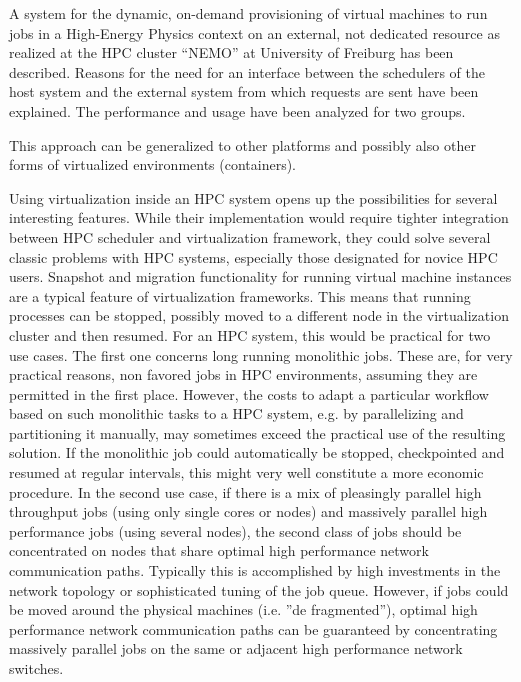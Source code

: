 



A system for the dynamic, on-demand provisioning of virtual machines
to run jobs in a High-Energy Physics context on an external, not
dedicated resource as realized at the HPC
cluster ``NEMO'' at University of Freiburg has been described. 
Reasons for the need for an interface between the schedulers of the host system
and the external system from which requests are sent have been
explained. 
The performance and usage have been analyzed for two groups. 

This approach can be generalized to other platforms and possibly also
other forms of virtualized environments (containers).


Using virtualization inside an HPC system opens up the possibilities for several interesting
features. While their implementation would require tighter integration between HPC
scheduler
and virtualization framework, they could solve several classic problems with HPC systems,
especially those designated for novice HPC users.
Snapshot and migration functionality for running virtual machine instances are a typical
feature of virtualization frameworks. This means that running processes can be stopped,
possibly
moved to a different node in the virtualization cluster and then resumed. For an HPC
system,
this would be practical for two use cases. The first one concerns long running monolithic
jobs.
These are, for very practical reasons, non favored jobs in HPC environments, assuming they
are permitted in the first place. However, the costs to adapt a particular workflow based on
such monolithic tasks to a HPC system, e.g. by parallelizing and partitioning it manually,
may sometimes exceed the practical use of the resulting solution. If the monolithic job
could
automatically be stopped, checkpointed and resumed at regular intervals, this might very
well
constitute a more economic procedure. In the second use case, if there is a mix of
pleasingly
parallel high throughput jobs (using only single cores or nodes) and massively parallel high
performance jobs (using several nodes), the second class of jobs should be concentrated on
nodes that share optimal high performance network communication paths. Typically this is
accomplished by high investments in the network topology or
sophisticated tuning of the
job
queue. However, if jobs could be moved around the physical machines (i.e. ”de
fragmented”),
optimal high performance network communication paths can be guaranteed by
concentrating
massively parallel jobs on the same or adjacent high performance network switches.

